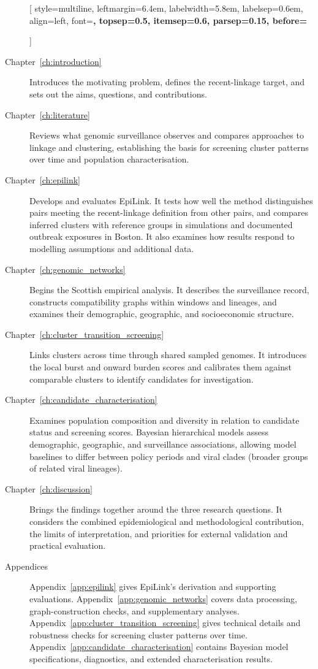 \begin{description}[
    style=multiline,
    leftmargin=6.4em,
    labelwidth=5.8em,
    labelsep=0.6em,
    align=left,
    font=\bfseries,
    topsep=0.5\baselineskip,
    itemsep=0.6\baselineskip,
    parsep=0.15\baselineskip,
    before=\raggedright%
]
    \item[Chapter~\ref{ch:introduction}] Introduces the motivating problem, defines the recent-linkage target, and sets out the aims, questions, and contributions.

    \item[Chapter~\ref{ch:literature}] Reviews what genomic surveillance observes and compares approaches to linkage and clustering, establishing the basis for screening cluster patterns over time and population characterisation.

    \item[Chapter~\ref{ch:epilink}] Develops and evaluates EpiLink. It tests how well the method distinguishes pairs meeting the recent-linkage definition from other pairs, and compares inferred clusters with reference groups in simulations and documented outbreak exposures in Boston. It also examines how results respond to modelling assumptions and additional data.

    \item[Chapter~\ref{ch:genomic_networks}] Begins the Scottish empirical analysis. It describes the surveillance record, constructs compatibility graphs within windows and lineages, and examines their demographic, geographic, and socioeconomic structure.

    \item[Chapter~\ref{ch:cluster_transition_screening}] Links clusters across time through shared sampled genomes. It introduces the local burst and onward burden scores and calibrates them against comparable clusters to identify candidates for investigation.

    \item[Chapter~\ref{ch:candidate_characterisation}] Examines population composition and diversity in relation to candidate status and screening scores. Bayesian hierarchical models assess demographic, geographic, and surveillance associations, allowing model baselines to differ between policy periods and viral clades (broader groups of related viral lineages).

    \item[Chapter~\ref{ch:discussion}] Brings the findings together around the three research questions. It considers the combined epidemiological and methodological contribution, the limits of interpretation, and priorities for external validation and practical evaluation.

    \item[Appendices] Appendix~\ref{app:epilink} gives EpiLink's derivation and supporting evaluations. Appendix~\ref{app:genomic_networks} covers data processing, graph-construction checks, and supplementary analyses. Appendix~\ref{app:cluster_transition_screening} gives technical details and robustness checks for screening cluster patterns over time. Appendix~\ref{app:candidate_characterisation} contains Bayesian model specifications, diagnostics, and extended characterisation results.
\end{description}
